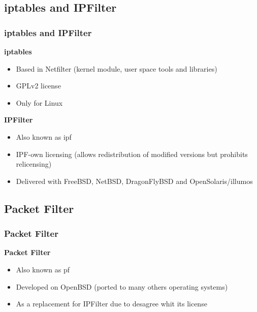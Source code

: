\documentclass{beamer}
\begin{document}
  \subsection{iptables and IPFilter}
  \begin{frame}
    \frametitle{iptables and IPFilter}
    \textbf{iptables}
    \begin{itemize}
      \item Based in Netfilter (kernel module, user space tools and libraries)
      \item GPLv2 license
      \item Only for Linux
    \end{itemize}
    \textbf{IPFilter}
    \begin{itemize}
      \item Also known as ipf
      \item IPF-own licensing (allows redistribution of modified versions but prohibits relicensing)
      \item Delivered with FreeBSD, NetBSD, DragonFlyBSD and OpenSolaris/illumos 
    \end{itemize}
  \end{frame}
  
  
  \subsection{Packet Filter}
  \begin{frame}
    \frametitle{Packet Filter}
    \textbf{Packet Filter}
    \begin{itemize}
      \item Also known as pf
      \item Developed on OpenBSD (ported to many others operating systems)
      \item As a replacement for IPFilter due to desagree whit its license
    \end{itemize}
  \end{frame}
\end{document}
